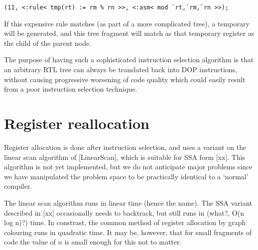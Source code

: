 \begin{verbatim}
(11, <:rule< tmp(rt) := rm % rn >>, <:asm< mod `rt,`rm,`rn >>);
\end{verbatim}

If this expensive rule matches (as part of a more complicated tree), a temporary will be generated, and this tree fragment will match as that temporary register as the child of the parent node.

The purpose of having such a sophisticated instruction selection algorithm is that an arbitrary RTL tree can always be translated back into DOP instructions, without causing progressive worsening of code quality which could easily result from a poor instruction selection technique.

\section{Register reallocation}

Register allocation is done after instruction selection, and uses a variant on the linear scan algorithm of [LinearScan], which is suitable for SSA form [xx]. This algorithm is not yet implemented, but we do not anticipate major problems since we have manipulated the problem space to be practically identical to a `normal' compiler.

The linear scan algorithm runs in linear time (hence the name). The SSA variant described in [xx] occasionally needs to backtrack, but still runs in (what?, O(n log n)?) time. In constrast, the common method of register allocation by graph colouring runs in quadratic time. It may be, however, that for small fragments of code the value of $n$ is small enough for this not to matter.
